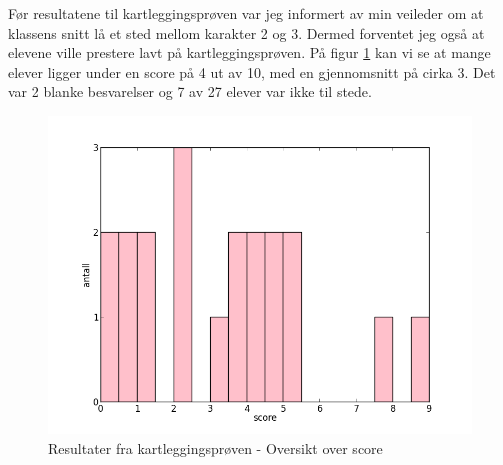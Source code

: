 \documentclass[main.tex]{subfiles}
\begin{document}
Før resultatene til kartleggingsprøven var jeg informert av min veileder om at klassens snitt lå et sted mellom
karakter 2 og 3. Dermed forventet jeg også at elevene ville prestere lavt på kartleggingsprøven. På figur 
\ref{fig:scoreoversikt} kan vi se at mange elever ligger under en score på 4 ut av 10, med en gjennomsnitt 
på cirka 3. Det var 2 blanke besvarelser og 7 av 27 elever var ikke til stede.
\begin{figure}[h!]
\centering
\includegraphics[scale = 0.5]{../figures/scoreoversikt.png}
\caption{Resultater fra kartleggingsprøven - Oversikt over score}
\label{fig:scoreoversikt}
\end{figure}
\end{document}
